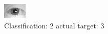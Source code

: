 \begin{figure}[h!]
\begin{center}
\includegraphics[width=0.60\columnwidth]{figures/ID1191_class_2_target_3.png}
\end{center}
\caption{ Classification: 2 actual target: 3}
\label{fig:ID1191_class_2_target_3}
\end{figure}
